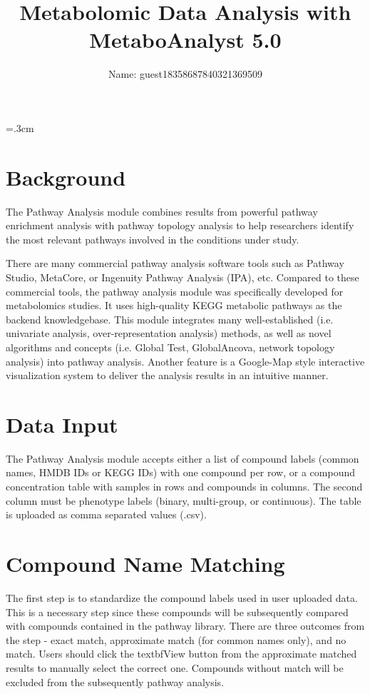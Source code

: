 \documentclass[a4paper]{article}
\title{Metabolomic Data Analysis with MetaboAnalyst 5.0}
\author{ Name: guest18358687840321369509 }
\begin{document}
\parskip=.3cm
\maketitle
\section{Background}
 The Pathway Analysis module combines results from powerful pathway  enrichment analysis with pathway topology analysis to help researchers identify the most relevant pathways involved in the conditions under study. 

 There are many commercial pathway analysis software tools such as Pathway Studio, MetaCore, or Ingenuity Pathway Analysis (IPA), etc. Compared to these commercial tools, the pathway analysis module was specifically developed  for metabolomics studies. It uses high-quality KEGG metabolic pathways as the backend knowledgebase.  This module integrates many well-established (i.e. univariate analysis, over-representation analysis) methods, as well as novel algorithms and concepts (i.e. Global Test, GlobalAncova, network topology analysis) into pathway analysis. Another feature is a Google-Map style interactive visualization system to deliver  the analysis results in an intuitive manner.
\section{Data Input}
 The Pathway Analysis module accepts either a list of compound labels (common names, HMDB IDs or KEGG IDs) with one compound per row,  or a compound concentration table with samples in rows and compounds in columns. The second column must be  phenotype labels (binary, multi-group, or continuous). The table is uploaded as comma separated values (.csv). 

\section{Compound Name Matching}

The first step is to standardize the compound labels used in user uploaded data. This is a necessary step since
these compounds will be subsequently compared with compounds contained in the pathway library.
There are three outcomes from the step - exact match, approximate match (for common names only), and no match.
Users should click the textbf{View} button from the approximate matched results to manually select the correct one.
Compounds without match will be excluded from the subsequently pathway analysis.
\end{document}

